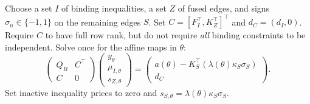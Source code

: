 \documentclass[11pt,letterpaper]{article}
\theoremstyle{definition}
\newcommand{\1}{\mathbf 1}
\begin{document}
Choose a set $I$ of binding inequalities, a set $Z$ of fused edges, and signs $\sigma_n\in\{-1,1\}$ on the remaining edges $S$. Set
$C=[F_I^\top,K_Z^\top]^\top$ and $d_C=(d_I,0)$. Require $C$ to have full row rank, but do not require \emph{all} binding constraints to be independent. Solve once for the affine maps in $\theta$:
\begin{equation}\label{eq:r13-cell-system}
 \begin{pmatrix}Q_B&C^\top\\ C&0\end{pmatrix}
 \begin{pmatrix}y_\theta\\ \mu_{I,\theta}\\s_{Z,\theta}\end{pmatrix}
 =\begin{pmatrix}a(\theta)-K_S^\top(\lambda(\theta)\kappa_S\sigma_S)\\d_C\end{pmatrix}.
\end{equation}
Set inactive inequality prices to zero and $s_{S,\theta}=\lambda(\theta)\kappa_S\sigma_S$.
\end{document}
